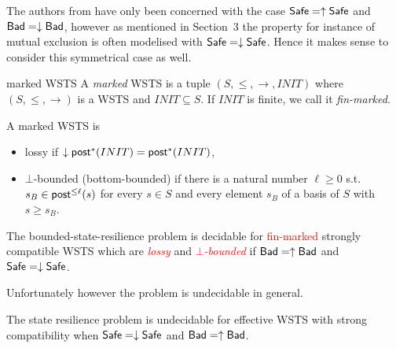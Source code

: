 The authors from \cite{DBLP:conf/gg/Ozkan22,DBLP:journals/corr/abs-2108-00889}
have only been concerned with the case $\textsf{Safe} = \uparrow \textsf{Safe}$
and $\textsf{Bad} =\downarrow \textsf{Bad}$, 
 however as mentioned in Section~3
the property for instance of mutual exclusion is often modelised with $\textsf{Safe} = \downarrow \textsf{Safe}$.
Hence it makes sense to consider this symmetrical case as well. \\




\begin{definition}{marked WSTS} 
A {\em marked} WSTS is a tuple $(S, \leq, \to, INIT)$
where $(S, \leq, \to)$ is a WSTS and $INIT \subseteq S$. 
If $INIT$ is finite, we call it {\em fin-marked}.
\end{definition}

\begin{definition}
A marked WSTS is
\begin{itemize}
\item lossy if $\downarrow \textsf{post}^* (INIT) = \textsf{post}^* (INIT)$,
\item $\bot$-bounded (bottom-bounded) if there is a natural number 
$\ell \geq 0$ s.t. $s_B \in \textsf{post}^{\leq \ell} (s) $ for every $ s \in S$ and every element 
$s_B$ of a basis of $S$ with $s \geq s_B$.
\end{itemize}
\end{definition}

\mathieu{}

\begin{theorem}{\cite{DBLP:conf/gg/Ozkan22}}
The bounded-state-resilience problem is decidable for \textcolor{red}{fin-marked} 
strongly compatible WSTS
 which are 
 {\em \textcolor{red}{lossy} } 
 and 
 {\em \textcolor{red}{$\bot$-bounded}  }
 if $\textsf{Bad} = \uparrow \textsf{Bad}$ and $\textsf{Safe} = \downarrow \textsf{Safe}$.
\end{theorem}



Unfortunately however the problem is undecidable in general.

\begin{theorem}
The state resilience problem is undecidable for effective WSTS with  strong  compatibility 
when
$\textsf{Safe}=\downarrow \textsf{Safe}$
and $\textsf{Bad}=\uparrow \textsf{Bad}$.
\end{theorem}

